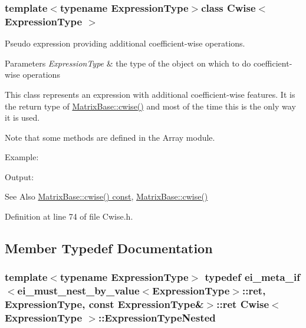 \subsubsection*{template$<$typename Expression\-Type$>$class Cwise$<$ Expression\-Type $>$}

Pseudo expression providing additional coefficient-\/wise operations. 


\begin{DoxyParams}{Parameters}
{\em Expression\-Type} & the type of the object on which to do coefficient-\/wise operations\\
\hline
\end{DoxyParams}
This class represents an expression with additional coefficient-\/wise features. It is the return type of \hyperlink{class_matrix_base_acb59453396d1eefa3781b404719d9602}{Matrix\-Base\-::cwise()} and most of the time this is the only way it is used.

Note that some methods are defined in the Array module.

Example\-:
\begin{DoxyCodeInclude}
\end{DoxyCodeInclude}
 Output\-:
\begin{DoxyVerbInclude}
\end{DoxyVerbInclude}


\begin{DoxySeeAlso}{See Also}
\hyperlink{class_matrix_base_af7878422bb2db0437229765c3c38f846}{Matrix\-Base\-::cwise() const}, \hyperlink{class_matrix_base_acb59453396d1eefa3781b404719d9602}{Matrix\-Base\-::cwise()} 
\end{DoxySeeAlso}


Definition at line 74 of file Cwise.\-h.



\subsection{Member Typedef Documentation}
\hypertarget{class_cwise_a0eb3cc18a0d32ab3966ab0add4316e2e}{
\subsubsection[{Expression\-Type\-Nested}]{\setlength{\rightskip}{0pt plus 5cm}template$<$typename Expression\-Type$>$ typedef {\bf ei\-\_\-meta\-\_\-if}$<${\bf ei\-\_\-must\-\_\-nest\-\_\-by\-\_\-value}$<$Expression\-Type$>$\-::{\bf ret}, Expression\-Type, const Expression\-Type\&$>$\-::{\bf ret} {\bf Cwise}$<$ Expression\-Type $>$\-::{\bf Expression\-Type\-Nested}}}\label{class_cwise_a0eb3cc18a0d32ab3966ab0add4316e2e}


